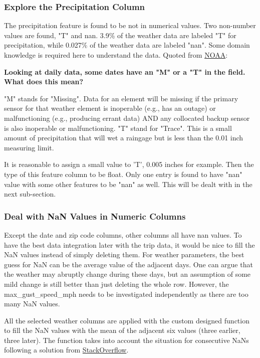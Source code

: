 \documentclass[a4paper]{article}
\begin{document}
			\subsubsection{Explore the Precipitation Column}
			The precipitation feature is found to be not in numerical values. Two non-number values are found, "T" and nan. 3.9\% of the weather data are labeled "T" for precipitation, while 0.027\% of the weather data are labeled "nan". Some domain knowledge is required here to understand the data. Quoted from \href{ http://www.nws.noaa.gov/om/csd/info/NOWdata/FAQ.php}{NOAA}:
			
			\begin{leftbar}
				\textbf{Looking at daily data, some dates have an "M" or a "T" in the field. What does this mean?}
				
				"M" stands for "Missing". Data for an element will be missing if the primary sensor for that weather element is inoperable (e.g., has an outage) or malfunctioning (e.g., producing errant data) AND any collocated backup sensor is also inoperable or malfunctioning. "T" stand for "Trace". This is a small amount of precipitation that will wet a raingage but is less than the 0.01 inch measuring limit.
			\end{leftbar}
			
			It is reasonable to assign a small value to 'T', 0.005 inches for example. Then the type of this feature column to be float. Only one entry is found to have "nan" value with some other features to be "nan" as well. This will be dealt with in the next sub-section. 
			
			\subsubsection{Deal with NaN Values in Numeric Columns}
			Except the date and zip code columns, other columns all have nan values. To have the best data integration later with the trip data, it would be nice to fill the NaN values instead of simply deleting them. For weather parameters, the best guess for NaN can be the average value of the adjacent days. One can argue that the weather may abruptly change during these days, but an assumption of some mild change is still better than just deleting the whole row. However, the max\_gust\_speed\_mph needs to be investigated independently as there are too many NaN values.
			
			All the selected weather columns are applied with the custom designed function to fill the NaN values with the mean of the adjacent six values (three earlier, three later). The function takes into account the situation for consecutive NaNs following a solution from \href{https://stackoverflow.com/questions/2154249/identify-groups-of-continuous-numbers-in-a-list}{StackOverflow}.
			
\end{document}

